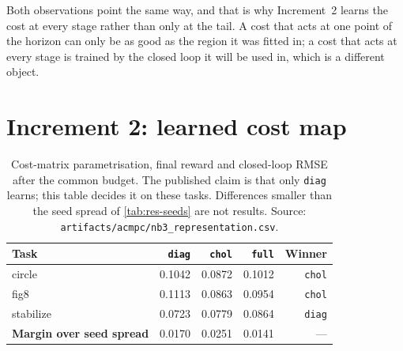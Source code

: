 \documentclass[11pt,a4paper,twoside,openright]{report}
\theoremstyle{plain}
\theoremstyle{definition}
\theoremstyle{remark}
\begin{document}
	Both observations point the same way, and that is why Increment~2 learns the
	cost at every stage rather than only at the tail. A cost that acts at one
	point of the horizon can only be as good as the region it was fitted in; a
	cost that acts at every stage is trained by the closed loop it will be used
	in, which is a different object.

	\section{Increment 2: learned cost map}
	\label{sec:res-acmpc}

	\begin{table}[htbp]
		\centering
		\caption{Cost-matrix parametrisation, final reward and closed-loop RMSE after
			the common budget. The published claim is that only \texttt{diag} learns;
			this table decides it on these tasks. Differences smaller than the seed
			spread of \cref{tab:res-seeds} are not results. Source:
			\texttt{artifacts/acmpc/nb3\_representation.csv}.}
		\label{tab:res-rep}
		\small
		\begin{tabularx}{\linewidth}{@{}X r r r r@{}}
			\toprule
			\textbf{Task} & \texttt{diag} & \texttt{chol} & \texttt{full} & \textbf{Winner} \\
			\midrule
			circle & 0.1042 & 0.0872 & 0.1012 & \texttt{chol} \\
			fig8 & 0.1113 & 0.0863 & 0.0954 & \texttt{chol} \\
			stabilize & 0.0723 & 0.0779 & 0.0864 & \texttt{diag} \\
			\midrule
			\textbf{Margin over seed spread} & 0.0170 & 0.0251 & 0.0141 & --- \\
			\bottomrule
		\end{tabularx}
	\end{table}
\end{document}
